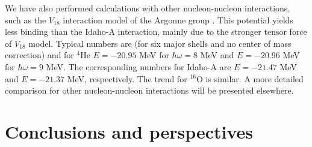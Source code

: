 
We have also performed calculations with other nucleon-nucleon interactions, 
such as the 
$V_{18}$ interaction model of the Argonne group \cite{bob95}. This potential 
yields less binding than the Idaho-A interaction, mainly due to the stronger tensor 
force of $V_{18}$ model. Typical numbers are (for six major shells and no
center of mass correction) and for
$^{4}$He $E=-20.95$ MeV for $\hbar\omega =8$ MeV and 
$E=-20.96$ MeV for $\hbar\omega=9$ MeV.
The corresponding numbers for Idaho-A
are $E=-21.47$  MeV and  $E=-21.37$ MeV, respectively.
The trend for $^{16}$O is similar. A more detailed comparison for other
nucleon-nucleon interactions will be presented elsewhere.

\section{Conclusions and perspectives}
\label{sec:conclusion}

